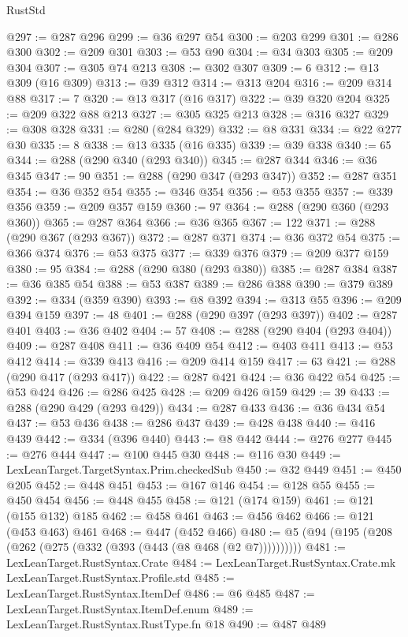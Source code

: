 \begin{lexlean}{RustStd}
\begin{coremodule}
{\begin{coremodule}
{{{{{{{{{{{{{@297 := @287 @296
@299 := @36 @297 @54
@300 := @203 @299
@301 := @286 @300
@302 := @209 @301
@303 := @53 @90
@304 := @34 @303
@305 := @209 @304
@307 := @305 @74 @213
@308 := @302 @307
@309 := 6
@312 := @13 @309 (@16 @309)
@313 := @39 @312
@314 := @313 @204
@316 := @209 @314 @88
@317 := 7
@320 := @13 @317 (@16 @317)
@322 := @39 @320 @204
@325 := @209 @322 @88 @213
@327 := @305 @325 @213
@328 := @316 @327
@329 := @308 @328
@331 := @280 (@284 @329)
@332 := @8 @331
@334 := @22 @277 @30
@335 := 8
@338 := @13 @335 (@16 @335)
@339 := @39 @338
@340 := 65
@344 := @288 (@290 @340 (@293 @340))
@345 := @287 @344
@346 := @36 @345
@347 := 90
@351 := @288 (@290 @347 (@293 @347))
@352 := @287 @351
@354 := @36 @352 @54
@355 := @346 @354
@356 := @53 @355
@357 := @339 @356
@359 := @209 @357 @159
@360 := 97
@364 := @288 (@290 @360 (@293 @360))
@365 := @287 @364
@366 := @36 @365
@367 := 122
@371 := @288 (@290 @367 (@293 @367))
@372 := @287 @371
@374 := @36 @372 @54
@375 := @366 @374
@376 := @53 @375
@377 := @339 @376
@379 := @209 @377 @159
@380 := 95
@384 := @288 (@290 @380 (@293 @380))
@385 := @287 @384
@387 := @36 @385 @54
@388 := @53 @387
@389 := @286 @388
@390 := @379 @389
@392 := @334 (@359 @390)
@393 := @8 @392
@394 := @313 @55
@396 := @209 @394 @159
@397 := 48
@401 := @288 (@290 @397 (@293 @397))
@402 := @287 @401
@403 := @36 @402
@404 := 57
@408 := @288 (@290 @404 (@293 @404))
@409 := @287 @408
@411 := @36 @409 @54
@412 := @403 @411
@413 := @53 @412
@414 := @339 @413
@416 := @209 @414 @159
@417 := 63
@421 := @288 (@290 @417 (@293 @417))
@422 := @287 @421
@424 := @36 @422 @54
@425 := @53 @424
@426 := @286 @425
@428 := @209 @426 @159
@429 := 39
@433 := @288 (@290 @429 (@293 @429))
@434 := @287 @433
@436 := @36 @434 @54
@437 := @53 @436
@438 := @286 @437
@439 := @428 @438
@440 := @416 @439
@442 := @334 (@396 @440)
@443 := @8 @442
@444 := @276 @277
@445 := @276 @444
@447 := @100 @445 @30
@448 := @116 @30
@449 := LexLeanTarget.TargetSyntax.Prim.checkedSub
@450 := @32 @449
@451 := @450 @205
@452 := @448 @451
@453 := @167 @146
@454 := @128 @55
@455 := @450 @454
@456 := @448 @455
@458 := @121 (@174 @159)
@461 := @121 (@155 @132) @185
@462 := @458 @461
@463 := @456 @462
@466 := @121 (@453 @463) @461
@468 := @447 (@452 @466)
@480 := @5 (@94 (@195 (@208 (@262 (@275 (@332 (@393 (@443 (@8 @468 (@2 @7))))))))))
@481 := LexLeanTarget.RustSyntax.Crate
@484 := LexLeanTarget.RustSyntax.Crate.mk LexLeanTarget.RustSyntax.Profile.std
@485 := LexLeanTarget.RustSyntax.ItemDef
@486 := @6 @485
@487 := LexLeanTarget.RustSyntax.ItemDef.enum
@489 := LexLeanTarget.RustSyntax.RustType.fn @18
@490 := @487 @489
}}}}}}}}}}}}}
\end{coremodule}}
\end{coremodule}
\end{lexlean}
